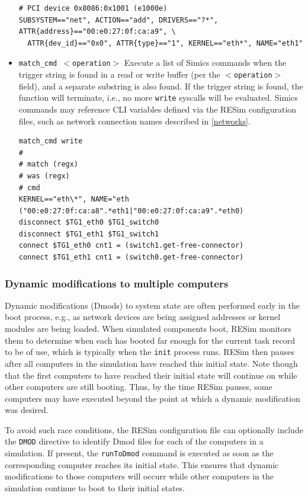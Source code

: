 \documentclass[titlepage]{article}
\begin{document}
\begin{itemize}
\begin{verbatim}
# PCI device 0x8086:0x1001 (e1000e)
SUBSYSTEM=="net", ACTION=="add", DRIVERS=="?*", ATTR{address}=="00:e0:27:0f:ca:a9", \
  ATTR{dev_id}=="0x0", ATTR{type}=="1", KERNEL=="eth*", NAME="eth1"
\end{verbatim}

\item {\tt match\_cmd $<$operation$>$} Execute a list of Simics commands when the trigger string is found
in a read or write buffer (per the {\tt $<$operation$>$} field), and a separate substring is also found.  If the trigger string is
found, the function will terminate, i.e., no more {\tt write} syscalls will be evaluated.  Simics commands may reference
CLI variables defined via the RESim configuration files, such as network connection names described in \ref{networks}.
\begin{verbatim}
match_cmd write
#
# match (regx)
# was (regx)
# cmd
KERNEL=="eth\*", NAME="eth
("00:e0:27:0f:ca:a8".*eth1|"00:e0:27:0f:ca:a9".*eth0)
disconnect $TG1_eth0 $TG1_switch0
disconnect $TG1_eth1 $TG1_switch1
connect $TG1_eth0 cnt1 = (switch1.get-free-connector)
connect $TG1_eth1 cnt1 = (switch0.get-free-connector)
\end{verbatim}
\end{itemize}

\subsubsection{Dynamic modifications to multiple computers}
Dynamic modifications (Dmods) to system state are often performed early in the boot process, e.g.,
as network devices are being assigned addresses or kernel modules are being loaded.
When simulated components boot, RESim monitors them to determine when each has booted far enough
for the current task record to be of use, which is typically when the {\tt init} process runs.
RESim then pauses after all computers in the simulation have reached this initial state.  Note though that
the first computers to have reached their initial state will continue on while other computers are still
booting.  Thus, by the time RESim pauses, some computers may have executed beyond the point
at which a dynamic modification was desired.

To avoid such race conditions, the RESim configuration file can optionally include the {\tt DMOD} directive
to identify Dmod files for each of the computers in a simulation.  If present, the {\tt runToDmod} command is executed
as soon as the corresponding computer reaches its initial state.  This ensures that dynamic modifications
to those computers will occurr while other computers in the simulation continue to boot to their 
initial states.
\end{document}
